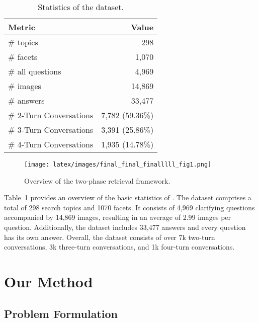 \documentclass[11pt]{article}
\begin{document}
\begin{table}[!t]
\centering
\small
\begin{tabular}{lr}
\toprule
\textbf{Metric} & \textbf{Value} \\ \midrule
\# topics & 298 \\ 
\# facets & 1,070 \\ 
\# all questions & 4,969 \\ 
\# images & 14,869 \\ 
\# answers & 33,477 \\
\# 2-Turn Conversations & 7,782 (59.36\%) \\ 
\# 3-Turn Conversations & 3,391 (25.86\%)\\ 
\# 4-Turn Conversations & 1,935 (14.78\%) \\ 
\bottomrule
\end{tabular}
\caption{Statistics of the \OurData{} dataset.}
\label{tab:dataset_stats1}
\vspace{-6mm}
\end{table}
\begin{figure*}[t]
    \centering
    \texttt{[image: latex/images/final\_final\_finalllll\_fig1.png]} 
    \caption{Overview of the \OurModel{} two-phase retrieval framework.}
    \label{fig:framework}
    \vspace{-4mm}
\end{figure*} 
Table~\ref{tab:dataset_stats1} provides an overview of the basic statistics of \OurData{}. The dataset comprises a total of 298 search topics and 1070 facets. It consists of 4,969 clarifying questions accompanied by 14,869 images, resulting in an average of 2.99 images per question. 
Additionally, the dataset includes 33,477 answers and every question has its own answer. Overall, the dataset consists of over 7k two-turn conversations, 3k three-turn conversations, and 1k four-turn conversations.



\section{Our Method} 
\subsection{Problem Formulation}
\end{document}
